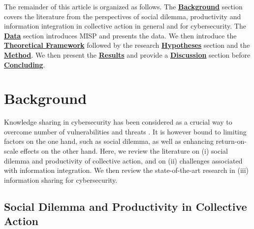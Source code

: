 \documentclass[unnumsec,webpdf,contemporary,large]{oup-authoring-template}%
\theoremstyle{thmstyleone}%
\theoremstyle{thmstyletwo}%
\theoremstyle{thmstylethree}%
\begin{document}
The remainder of this article is organized as follows. The \textbf{\hyperref[sec:background]{Background}} section covers the literature from the perspectives of social dilemma, productivity and information integration in collective action in general and for cybersecurity. The \textbf{\hyperref[sec:data]{Data}} section introduces MISP and presents the data. We then introduce the \textbf{\hyperref[sec:theory]{Theoretical Framework}} followed by the research \textbf{\hyperref[sec:hypotheses]{Hypotheses}} section and the \textbf{\hyperref[sec:method]{Method}}. We then present the \textbf{\hyperref[sec:results]{Results}} and provide a \textbf{\hyperref[sec:discussion]{Discussion}} section before \textbf{\hyperref[sec:conclusion]{Concluding}}.

\section{Background}
\label{sec:background}
Knowledge sharing in cybersecurity has been considered as a crucial way to overcome number of vulnerabilities \cite{mell_common_2006} and threats \cite{sridhar_cybersecurity_2021}. It is however bound to limiting factors on the one hand, such as social dilemma, as well as enhancing return-on-scale effects on the other hand. Here, we review the literature on (i) social dilemma and productivity of collective action, and on (ii) challenges associated with information integration. We then review the state-of-the-art research in (iii) information sharing for cybersecurity.

\subsection{Social Dilemma and Productivity in Collective Action}
\label{social_dilemma}
\end{document}
